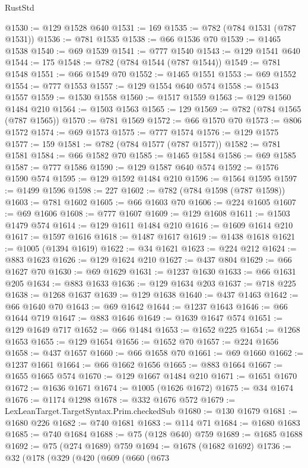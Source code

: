 \begin{lexlean}{RustStd}
\begin{coremodule}
@1530 := @129 @1528 @640
@1531 := 169
@1535 := @782 (@784 @1531 (@787 @1531))
@1536 := @781 @1535
@1538 := @66 @1536 @70
@1539 := @1465 @1538
@1540 := @69 @1539
@1541 := @777 @1540
@1543 := @129 @1541 @640
@1544 := 175
@1548 := @782 (@784 @1544 (@787 @1544))
@1549 := @781 @1548
@1551 := @66 @1549 @70
@1552 := @1465 @1551
@1553 := @69 @1552
@1554 := @777 @1553
@1557 := @129 @1554 @640 @574
@1558 := @1543 @1557
@1559 := @1530 @1558
@1560 := @1517 @1559
@1563 := @129 @1560 @1484 @210
@1564 := @1503 @1563
@1565 := 129
@1569 := @782 (@784 @1565 (@787 @1565))
@1570 := @781 @1569
@1572 := @66 @1570 @70
@1573 := @806 @1572
@1574 := @69 @1573
@1575 := @777 @1574
@1576 := @129 @1575
@1577 := 159
@1581 := @782 (@784 @1577 (@787 @1577))
@1582 := @781 @1581
@1584 := @66 @1582 @70
@1585 := @1465 @1584
@1586 := @69 @1585
@1587 := @777 @1586
@1590 := @129 @1587 @640 @574
@1592 := @1576 @1590 @574
@1595 := @129 @1592 @1484 @210
@1596 := @1564 @1595
@1597 := @1499 @1596
@1598 := 227
@1602 := @782 (@784 @1598 (@787 @1598))
@1603 := @781 @1602
@1605 := @66 @1603 @70
@1606 := @224 @1605
@1607 := @69 @1606
@1608 := @777 @1607
@1609 := @129 @1608
@1611 := @1503 @1479 @574
@1614 := @129 @1611 @1484 @210
@1616 := @1609 @1614 @210
@1617 := @1597 @1616
@1618 := @1487 @1617
@1619 := @1438 @1618
@1621 := @1005 (@1394 @1619)
@1622 := @34 @1621
@1623 := @224 @212
@1624 := @883 @1623
@1626 := @129 @1624 @210
@1627 := @437 @804
@1629 := @66 @1627 @70
@1630 := @69 @1629
@1631 := @1237 @1630
@1633 := @66 @1631 @205
@1634 := @883 @1633
@1636 := @129 @1634 @203
@1637 := @718 @225
@1638 := @1268 @1637
@1639 := @129 @1638
@1640 := @437 @1463
@1642 := @66 @1640 @70
@1643 := @69 @1642
@1644 := @1237 @1643
@1646 := @66 @1644 @719
@1647 := @883 @1646
@1649 := @1639 @1647 @574
@1651 := @129 @1649 @717
@1652 := @66 @1484
@1653 := @1652 @225
@1654 := @1268 @1653
@1655 := @129 @1654
@1656 := @1652 @70
@1657 := @224 @1656
@1658 := @437 @1657
@1660 := @66 @1658 @70
@1661 := @69 @1660
@1662 := @1237 @1661
@1664 := @66 @1662 @1656
@1665 := @883 @1664
@1667 := @1655 @1665 @574
@1670 := @129 @1667 @1484 @210
@1671 := @1651 @1670
@1672 := @1636 @1671
@1674 := @1005 (@1626 @1672)
@1675 := @34 @1674
@1676 := @1174 @1298
@1678 := @332 @1676 @572
@1679 := LexLeanTarget.TargetSyntax.Prim.checkedSub
@1680 := @130 @1679
@1681 := @1680 @226
@1682 := @740 @1681
@1683 := @114 @71
@1684 := @1680 @1683
@1685 := @740 @1684
@1688 := @75 (@128 @640) @759
@1689 := @1685 @1688
@1692 := @75 (@274 @1689) @759
@1694 := @1678 (@1682 @1692)
@1736 := @32
    (@178
      (@329
        (@420
          (@609
            (@660
              (@673

\end{coremodule}
\end{lexlean}
